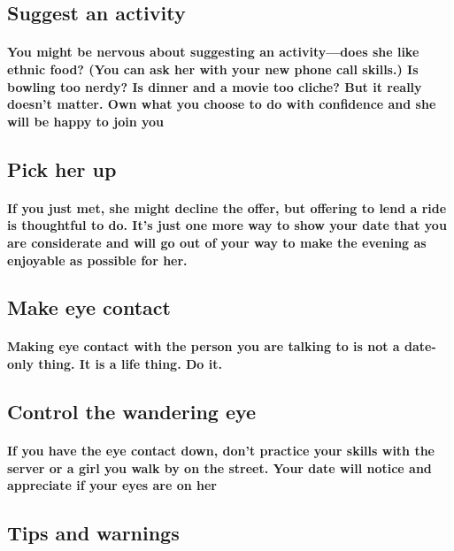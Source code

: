 \documentclass[11pt]{report}
\begin{document}
\subsection{Suggest an activity}
\paragraph{You might be nervous about suggesting an activity—does she like ethnic food? (You can ask her with your new phone call skills.) Is bowling too nerdy? Is dinner and a movie too cliche? But it really doesn’t matter. Own what you choose to do with confidence and she will be happy to join you}

\subsection{Pick her up}
\paragraph{If you just met, she might decline the offer, but offering to lend a ride is thoughtful to do. It’s just one more way to show your date that you are considerate and will go out of your way to make the evening as enjoyable as possible for her. }


\subsection{Make eye contact}
\paragraph{Making eye contact with the person you are talking to is not a date-only thing. It is a life thing. Do it. }

\subsection{Control the wandering eye}
\paragraph{If you have the eye contact down, don’t practice your skills with the server or a girl you walk by on the street. Your date will notice and appreciate if your eyes are on her}



\subsection{Tips and warnings}
\end{document}
